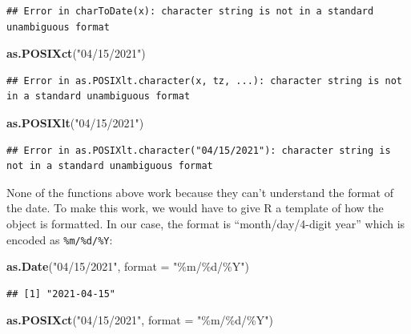 \documentclass[
]{book}
\newenvironment{Shaded}{\begin{snugshade}}{\end{snugshade}}
\newcommand{\AttributeTok}[1]{\textcolor[rgb]{0.13,0.29,0.53}{#1}}
\newcommand{\FunctionTok}[1]{\textcolor[rgb]{0.13,0.29,0.53}{\textbf{#1}}}
\newcommand{\NormalTok}[1]{#1}
\newcommand{\StringTok}[1]{\textcolor[rgb]{0.31,0.60,0.02}{#1}}
\begin{document}
\begin{verbatim}
## Error in charToDate(x): character string is not in a standard unambiguous format
\end{verbatim}

\begin{Shaded}
\begin{Highlighting}[]
\FunctionTok{as.POSIXct}\NormalTok{(}\StringTok{"04/15/2021"}\NormalTok{)}
\end{Highlighting}
\end{Shaded}

\begin{verbatim}
## Error in as.POSIXlt.character(x, tz, ...): character string is not in a standard unambiguous format
\end{verbatim}

\begin{Shaded}
\begin{Highlighting}[]
\FunctionTok{as.POSIXlt}\NormalTok{(}\StringTok{"04/15/2021"}\NormalTok{)}
\end{Highlighting}
\end{Shaded}

\begin{verbatim}
## Error in as.POSIXlt.character("04/15/2021"): character string is not in a standard unambiguous format
\end{verbatim}

None of the functions above work because they can't understand the format of the date. To make this work, we would have to give R a template of how the object is formatted. In our case, the format is ``month/day/4-digit year'' which is encoded as \texttt{\%m/\%d/\%Y}:

\begin{Shaded}
\begin{Highlighting}[]
\FunctionTok{as.Date}\NormalTok{(}\StringTok{"04/15/2021"}\NormalTok{, }\AttributeTok{format =} \StringTok{"\%m/\%d/\%Y"}\NormalTok{)}
\end{Highlighting}
\end{Shaded}

\begin{verbatim}
## [1] "2021-04-15"
\end{verbatim}

\begin{Shaded}
\begin{Highlighting}[]
\FunctionTok{as.POSIXct}\NormalTok{(}\StringTok{"04/15/2021"}\NormalTok{, }\AttributeTok{format =} \StringTok{"\%m/\%d/\%Y"}\NormalTok{)}
\end{Highlighting}
\end{Shaded}
\end{document}
